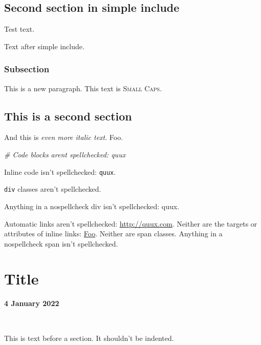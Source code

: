 \documentclass[
  12pt,
  a4paper,
]{article}
\newenvironment{Shaded}{}{}
\newcommand{\CommentTok}[1]{\textcolor[rgb]{0.38,0.63,0.69}{\textit{#1}}}
\begin{document}
\hypertarget{__h2_7}{%
\subsection{Second section in simple include}\label{__h2_7}}

\makeatletter
\@afterindentfalse
\@afterheading
\makeatother

Test text.

Text after simple include.

\hypertarget{__h3_4}{%
\subsubsection{Subsection}\label{__h3_4}}

\makeatletter
\@afterindentfalse
\@afterheading
\makeatother

This is a new paragraph. This text is \textsc{Small Caps}.

\hypertarget{quux-not-spellchecked}{%
\subsection{This is a second section}\label{quux-not-spellchecked}}

\makeatletter
\@afterindentfalse
\@afterheading
\makeatother

And this is \emph{even more italic text}. Foo.

\begin{Shaded}
\begin{Highlighting}[]
\CommentTok{\# Code blocks aren\textquotesingle{}t spellchecked: quux}
\end{Highlighting}
\end{Shaded}

\makeatletter
\@afterindentfalse
\@afterheading
\makeatother

Inline code isn't spellchecked: \texttt{quux}.

\texttt{div} classes aren't spellchecked.

Anything in a nospellcheck div isn't spellchecked: quux.

Automatic links aren't spellchecked: \url{http://quux.com}. Neither are
the targets or attributes of inline links: \href{http://quux.com}{Foo}.
Neither are {span classes}. Anything in a nospellcheck span isn't
spellchecked.

\hypertarget{__h1_4}{%
\section{Title}\label{__h1_4}}

\makeatletter
\@afterindentfalse
\@afterheading
\makeatother

\textbf{4 January 2022}

~

\makeatletter
\@afterindentfalse
\@afterheading
\makeatother

This is text before a section. It shouldn't be indented.
\end{document}
